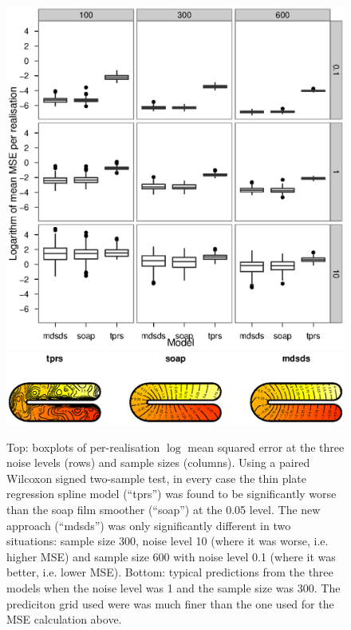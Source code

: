 \documentclass[useAMS,referee, usegraphicx]{biom}
\begin{document}
\begin{figure}
\centering
\includegraphics[width=\textwidth]{examples/ramsay/ramsay-result.eps} \\ \includegraphics[width=\textwidth]{examples/ramsay/ramsay-real.eps}
\caption{Top: boxplots of per-realisation $\log$ mean squared error at the three noise levels (rows) and sample sizes (columns). Using a paired Wilcoxon signed two-sample test, in every case the thin plate regression spline model (``tprs'') was found to be significantly worse than the soap film smoother (``soap'') at the 0.05 level. The new approach (``mdsds'') was only significantly different in two situations: sample size 300, noise level 10 (where it was worse, i.e. higher MSE) and sample size 600 with noise level 0.1 (where it was better, i.e. lower MSE). Bottom: typical predictions from the three models when the noise level was 1 and the sample size was 300. The prediciton grid used were was much finer than the one used for the MSE calculation above.}
\label{ramsay-results}
\end{figure}
\end{document}
